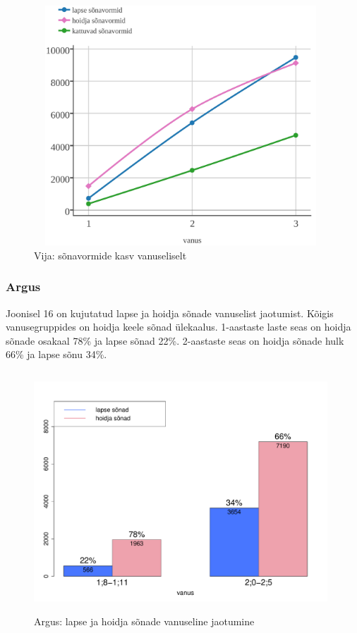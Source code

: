 \documentclass[12pt]{article}
\begin{document}

\begin{figure}[H]
    \centering
    \includegraphics[width=11cm, height=9cm]{vija_kum_crop}
    \caption{Vija: sõnavormide kasv vanuseliselt}
\end{figure}



\subsubsection{Argus}

Joonisel 16 on kujutatud lapse ja hoidja sõnade vanuselist jaotumist. Kõigis vanusegruppides on hoidja keele sõnad ülekaalus. 1-aastaste laste seas on hoidja sõnade osakaal 78\% ja lapse sõnad 22\%. 2-aastaste seas on hoidja sõnade hulk 66\% ja lapse sõnu 34\%.

\begin{figure}[H]
    \centering
    \includegraphics[width=11cm, height=9cm]{argus_vanus_sonad}
    \caption{Argus: lapse ja hoidja sõnade vanuseline jaotumine}
\end{figure}
\end{document}
